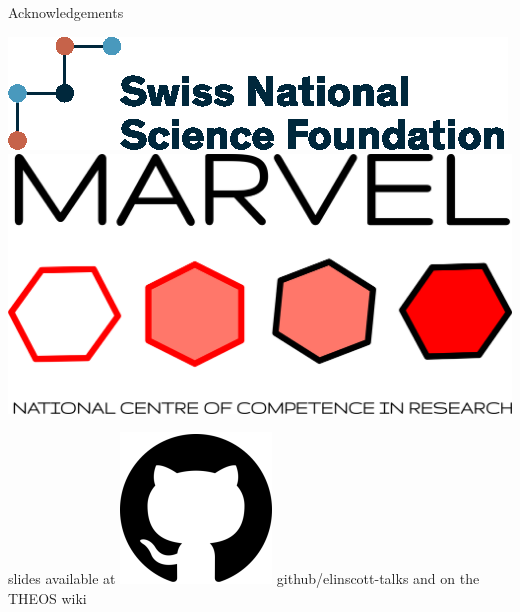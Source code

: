 \documentclass[xcolor=table,aspectratio=169]{beamer}
\numberwithin{equation}{section}
\newcommand{\insertframeinfo}{\insertframenumber/\inserttotalframenumber}
\newcommand{\backupbegin}{
   \newcounter{finalframe}
   \setcounter{finalframe}{\value{framenumber}}
   \renewcommand{\insertframeinfo}{}
}
\newcommand{\backupend}{
   \setcounter{framenumber}{\value{finalframe}}
}
\begin{document}
\begin{frame}{Acknowledgements}
   \begin{center}
      \includegraphics[height = 0.15\paperheight]{logos/SNF_logo_standard_print_color_pos_e.eps}
      \hspace{3em}
      \includegraphics[height = 0.15\paperheight]{figures/marvel_trimmed.png}
   \end{center}

   \vspace{1ex}

   \begin{center}
      slides available at \includegraphics[height=\fontcharht\font`\B]{logos/github-favicon.png} github/elinscott-talks and on the THEOS wiki
   \end{center}

   \vspace{2ex}
   \scriptsize


   \vspace{2ex}
   \scriptsize
\end{frame}
\endgroup
% 
% 
% 
% 
% 
\end{document}
